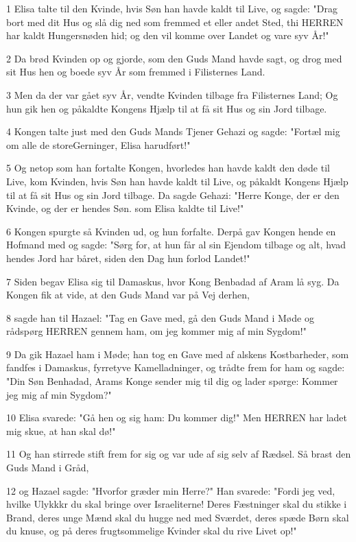 \par 1 Elisa talte til den Kvinde, hvis Søn han havde kaldt til Live, og sagde: "Drag bort med dit Hus og slå dig ned som fremmed et eller andet Sted, thi HERREN har kaldt Hungersnøden hid; og den vil komme over Landet og vare syv År!"
\par 2 Da brød Kvinden op og gjorde, som den Guds Mand havde sagt, og drog med sit Hus hen og boede syv År som fremmed i Filisternes Land.
\par 3 Men da der var gået syv År, vendte Kvinden tilbage fra Filisternes Land; Og hun gik hen og påkaldte Kongens Hjælp til at få sit Hus og sin Jord tilbage.
\par 4 Kongen talte just med den Guds Mands Tjener Gehazi og sagde: "Fortæl mig om alle de storeGerninger, Elisa harudført!"
\par 5 Og netop som han fortalte Kongen, hvorledes han havde kaldt den døde til Live, kom Kvinden, hvis Søn han havde kaldt til Live, og påkaldt Kongens Hjælp til at få sit Hus og sin Jord tilbage. Da sagde Gehazi: "Herre Konge, der er den Kvinde, og der er hendes Søn. som Elisa kaldte til Live!"
\par 6 Kongen spurgte så Kvinden ud, og hun forfalte. Derpå gav Kongen hende en Hofmand med og sagde: "Sørg for, at hun får al sin Ejendom tilbage og alt, hvad hendes Jord har båret, siden den Dag hun forlod Landet!"
\par 7 Siden begav Elisa sig til Damaskus, hvor Kong Benbadad af Aram lå syg. Da Kongen fik at vide, at den Guds Mand var på Vej derhen,
\par 8 sagde han til Hazael: "Tag en Gave med, gå den Guds Mand i Møde og rådspørg HERREN gennem ham, om jeg kommer mig af min Sygdom!"
\par 9 Da gik Hazael ham i Møde; han tog en Gave med af alskens Kostbarheder, som fandfes i Damaskus, fyrretyve Kamelladninger, og trådte frem for ham og sagde: "Din Søn Benhadad, Arams Konge sender mig til dig og lader spørge: Kommer jeg mig af min Sygdom?"
\par 10 Elisa svarede: "Gå hen og sig ham: Du kommer dig!" Men HERREN har ladet mig skue, at han skal dø!"
\par 11 Og han stirrede stift frem for sig og var ude af sig selv af Rædsel. Så brast den Guds Mand i Gråd,
\par 12 og Hazael sagde: "Hvorfor græder min Herre?" Han svarede: "Fordi jeg ved, hvilke Ulykkkr du skal bringe over Israeliterne! Deres Fæstninger skal du stikke i Brand, deres unge Mænd skal du hugge ned med Sværdet, deres spæde Børn skal du knuse, og på deres frugtsommelige Kvinder skal du rive Livet op!"
